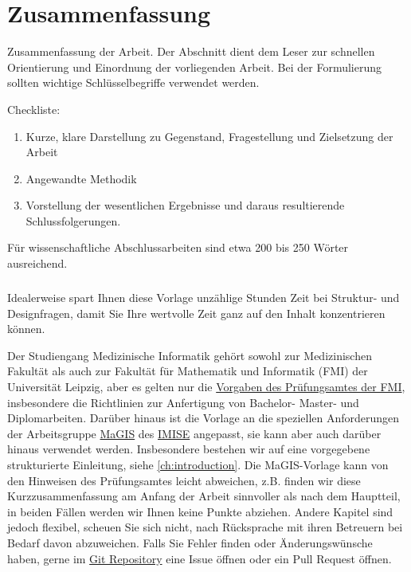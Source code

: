 \chapter*{Zusammenfassung}
\begin{temp}
Zusammenfassung der Arbeit.
Der Abschnitt dient dem Leser zur schnellen Orientierung und Einordnung der vorliegenden Arbeit.
Bei der Formulierung sollten wichtige Schlüsselbegriffe verwendet werden.

Checkliste:
\begin{enumerate}
\item Kurze, klare Darstellung zu Gegenstand, Fragestellung und Zielsetzung der Arbeit
\item Angewandte Methodik
\item Vorstellung der wesentlichen Ergebnisse und daraus resultierende Schlussfolgerungen.
\end{enumerate}
Für wissenschaftliche Abschlussarbeiten sind etwa 200 bis 250 Wörter ausreichend.

\paragraph{}
Idealerweise spart Ihnen diese Vorlage unzählige Stunden Zeit bei Struktur- und Designfragen, damit Sie Ihre wertvolle Zeit ganz auf den Inhalt konzentrieren können.

Der Studiengang Medizinische Informatik gehört sowohl zur Medizinischen Fakultät als auch zur Fakultät für Mathematik und Informatik (FMI) der Universität Leipzig,
aber es gelten nur die \href{https://www.mathcs.uni-leipzig.de/studium/studienorganisation/formulare}{Vorgaben des Prüfungsamtes der FMI},
insbesondere die Richtlinien zur Anfertigung von Bachelor- Master- und Diplomarbeiten.
Darüber hinaus ist die Vorlage an die speziellen Anforderungen der Arbeitsgruppe \href{https://www.imise.uni-leipzig.de/en/Research/MaGIS}{MaGIS} des \href{https://www.imise.uni-leipzig.de/}{IMISE} angepasst, sie kann aber auch darüber hinaus verwendet werden.
Insbesondere bestehen wir auf eine vorgegebene strukturierte Einleitung, siehe \cref{ch:introduction}.
Die MaGIS-Vorlage kann von den Hinweisen des Prüfungsamtes leicht abweichen, z.B. finden wir diese Kurzzusammenfassung am Anfang der Arbeit sinnvoller als nach dem Hauptteil, in beiden Fällen werden wir Ihnen keine Punkte abziehen.
Andere Kapitel sind jedoch flexibel, scheuen Sie sich nicht, nach Rücksprache mit ihren Betreuern bei Bedarf davon abzuweichen.
Falls Sie Fehler finden oder Änderungswünsche haben, gerne im \href{https://github.com/IMISE/imise-classicthesis/}{Git Repository} eine Issue öffnen oder ein Pull Request öffnen.


\end{temp}
